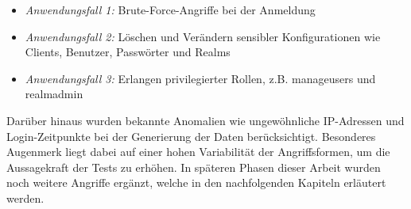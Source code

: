 \documentclass[a4paper,12pt]{article}
\begin{document}
	\begin{itemize}
		\item \textit{Anwendungsfall 1:} Brute-Force-Angriffe bei der Anmeldung
		\item \textit{Anwendungsfall 2:} Löschen und Verändern sensibler Konfigurationen wie Clients, Benutzer, Passwörter und Realms
		\item \textit{Anwendungsfall 3:} Erlangen privilegierter Rollen, z.B. \gls{manageusers} und \gls{realmadmin}
	\end{itemize}
	Darüber hinaus wurden bekannte Anomalien wie ungewöhnliche IP-Adressen und Login-Zeitpunkte bei der Generierung der Daten berücksichtigt. Besonderes Augenmerk liegt dabei auf einer hohen Variabilität der Angriffsformen, um die Aussagekraft der Tests zu erhöhen. In späteren Phasen dieser Arbeit wurden noch weitere Angriffe ergänzt, welche in den nachfolgenden Kapiteln erläutert werden.
\end{document}

